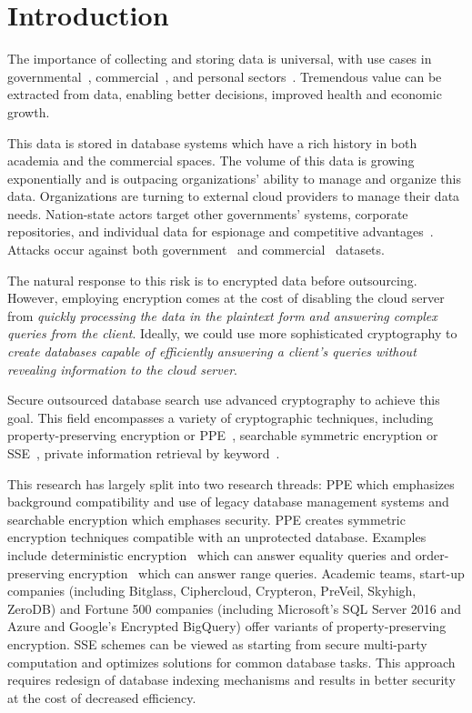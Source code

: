 
\section{Introduction}

The importance of collecting and storing data is universal, with use cases in governmental~\cite{Powers2014}, commercial~\cite{Linoff:2002:MWT:560274,insightdata}, and personal sectors~\cite{Mons2011}.  Tremendous value can be extracted from data, enabling better decisions, improved health and economic growth.

This data is stored in database systems which have a rich history in both academia and the commercial spaces.  The volume of this data is growing exponentially and is outpacing organizations' ability to manage and
organize this data.  Organizations are turning to external cloud providers
to manage their data needs.  
%
Nation-state actors target other governments' systems, corporate repositories, and individual data for espionage and competitive advantages~\cite{apt1}.   Attacks occur against both government~\cite{CyberAttacksOPM} and commercial~\cite{CyberAttacks,gressin2017equifax} datasets.

The natural response to this risk is to encrypted data before outsourcing. 
%
However, employing encryption comes at the cost of disabling the cloud server
from {\em quickly processing the data in the plaintext form and answering
complex queries from the client}. 
%
Ideally, we could use more sophisticated cryptography to {\em create databases
capable of efficiently answering a client's queries without revealing
information to the cloud server}.  


Secure outsourced database search use advanced cryptography to achieve this goal.  This field encompasses a variety of cryptographic techniques, including property-preserving encryption or PPE~\cite{EC:PanRou12}, searchable symmetric encryption or SSE~\cite{CCS:CGKO06}, private information retrieval by keyword~\cite{EPRINT:ChoGilNao98}.  

This research has largely split into two research threads: PPE which emphasizes background compatibility and use of legacy database management systems and searchable encryption which emphases security.  PPE creates symmetric encryption techniques
compatible with an unprotected database. Examples include deterministic
encryption~\cite{C:BelBolONe07} which can answer equality queries and order-preserving encryption~\cite{C:BolCheONe11,EC:BCLO09}
which can answer range queries. Academic teams, start-up companies (including Bitglass, Ciphercloud, Crypteron, PreVeil, Skyhigh, ZeroDB) and Fortune
500 companies (including Microsoft's SQL Server 2016 and Azure and Google's Encrypted BigQuery)  offer variants of property-preserving encryption.
%
SSE schemes can be viewed as starting from secure multi-party computation and
optimizes solutions for common database tasks. This approach requires redesign
of database indexing mechanisms and results in better security at the cost of
decreased efficiency. 

